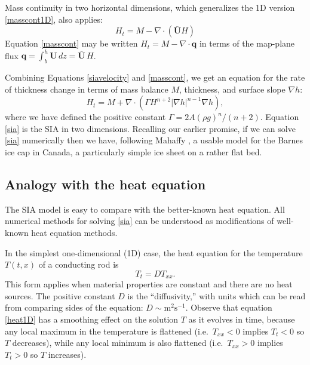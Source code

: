 \documentclass[letterpaper,final,12pt,reqno]{amsart}
\newcommand{\bq}{\mathbf{q}}
\newcommand{\grad}{\nabla}
\newcommand{\Div}{\nabla\cdot}
\begin{document}
Mass continuity in two horizontal dimensions, which generalizes the 1D version \eqref{masscont1D}, also applies:
\begin{equation}
    H_t = M - \Div\left(\bar{\mathbf{U}} H\right)  \label{masscont}
\end{equation}
Equation \eqref{masscont} may be written $H_t = M - \Div \bq$ in terms of the map-plane flux $\bq = \int_{b}^{h} \mathbf{U}\,dz = \bar{\mathbf{U}}\,H$.

Combining Equations \eqref{siavelocity} and \eqref{masscont}, we get an equation for the rate of thickness change in terms of mass balance $M$, thickness, and surface slope $\grad h$:
\begin{equation}
H_t = M + \Div \left(\Gamma H^{n+2} |\grad h|^{n-1} \grad h \right), \label{sia}
\end{equation}
where we have defined the positive constant $\Gamma = 2 A (\rho g)^n / (n+2)$.  Equation \eqref{sia} is the SIA in two dimensions.  Recalling our earlier promise, if we can solve \eqref{sia} numerically then we have, following Mahaffy \cite{Mahaffy}, a usable model for the Barnes ice cap in Canada, a particularly simple ice sheet on a rather flat bed.

\subsection*{Analogy with the heat equation}  The SIA model is easy to compare with the better-known heat equation.  All numerical methods for solving \eqref{sia} can be understood as modifications of well-known heat equation methods.

In the simplest one-dimensional (1D) case, the heat equation for the temperature $T(t,x)$ of a conducting rod is
\begin{equation}
  T_t = D T_{xx}. \label{heat1D}
\end{equation}
This form applies when material properties are constant and there are no heat sources.  The positive constant $D$ is the ``diffusivity,'' with units which can be read from comparing sides of the equation: $D\sim \text{m}^2 \text{s}^{-1}$.  Observe that equation \eqref{heat1D} has a smoothing effect on the solution $T$ as it evolves in time, because any local maximum in the temperature is flattened (i.e.~$T_{xx}<0$ implies $T_t<0$ so $T$ decreases), while any local minimum is also flattened (i.e.~$T_{xx}>0$ implies $T_t>0$ so $T$ increases).
\end{document}
